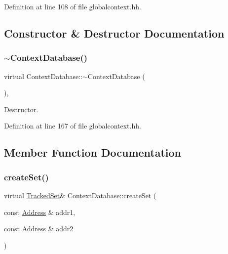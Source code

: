 Definition at line 108 of file globalcontext.\+hh.



\subsection{Constructor \& Destructor Documentation}
\mbox{\label{class_context_database_a1700beca09c54b649aa4f68b8c850795}} 
\subsubsection{\texorpdfstring{$\sim$ContextDatabase()}{~ContextDatabase()}}
{\footnotesize\ttfamily virtual Context\+Database\+::$\sim$\+Context\+Database (\begin{DoxyParamCaption}{ }\end{DoxyParamCaption})\hspace{0.3cm}{\ttfamily [inline]}, {\ttfamily [virtual]}}



Destructor. 



Definition at line 167 of file globalcontext.\+hh.



\subsection{Member Function Documentation}
\mbox{\label{class_context_database_aba61e2244e4c12105ed5b45a47720808}} 
\subsubsection{\texorpdfstring{createSet()}{createSet()}}
{\footnotesize\ttfamily virtual \mbox{\hyperlink{globalcontext_8hh_a7559d2c55c5d12fbbaf0418733b62438}{Tracked\+Set}}\& Context\+Database\+::create\+Set (\begin{DoxyParamCaption}\item[{const \mbox{\hyperlink{class_address}{Address}} \&}]{addr1,  }\item[{const \mbox{\hyperlink{class_address}{Address}} \&}]{addr2 }\end{DoxyParamCaption})\hspace{0.3cm}{\ttfamily [pure virtual]}}



